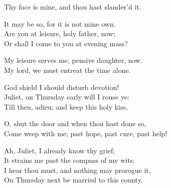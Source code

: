 \begin{speech}
Thy face is mine, and thou hast slander'd it. \\
\end{speech}
\begin{speech}
It may be so, for it is not mine own. \\
Are you at leisure, holy father, now; \\
Or shall I come to you at evening mass? \\
\end{speech}
\begin{speech}
My leisure serves me, pensive daughter, now. \\

My lord, we must entreat the time alone. \\
\end{speech}
\begin{speech}
God shield I should disturb devotion! \\
Juliet, on Thursday early will I rouse ye: \\
Till then, adieu; and keep this holy kiss.  \\

\end{speech}
\begin{speech}
O, shut the door and when thou hast done so, \\
Come weep with me; past hope, past cure, past help! \\
\end{speech}
\begin{speech}
Ah, Juliet, I already know thy grief; \\
It strains me past the compass of my wits: \\
I hear thou must, and nothing may prorogue it, \\
On Thursday next be married to this county. \\
\end{speech}
